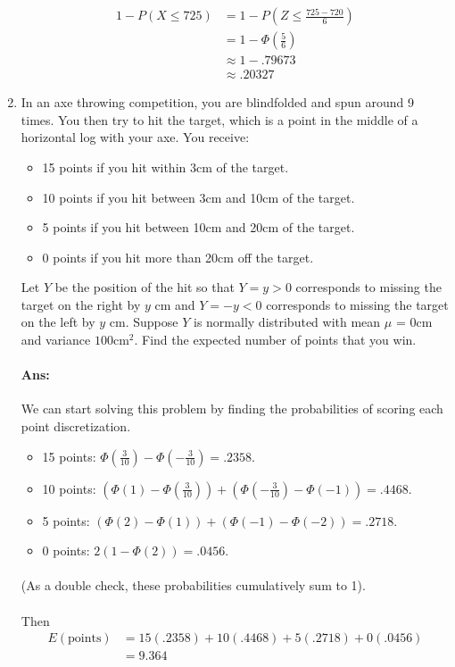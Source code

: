 \documentclass[letterpaper,12pt]{article}
\begin{document}
\begin{enumerate}
\begin{align*}
    1 - P(X \le 725) &= 1 - P(Z \le \frac{725-720}{6})\\
                     &= 1 - \Phi(\frac{5}{6})\\
                     &\approx 1 - .79673\\
                     &\approx .20327
\end{align*}
\item In an axe throwing competition, you are blindfolded and spun around 9 times. You then
try to hit the target, which is a point in the middle of a horizontal log with your axe.
You receive:

\begin{itemize}
    \item 15 points if you hit within 3cm of the target.
    \item 10 points if you hit between 3cm and 10cm of the target.
    \item 5 points if you hit between 10cm and 20cm of the target.
    \item 0 points if you hit more than 20cm off the target.
\end{itemize}
Let $Y$ be the position of the hit so that $Y = y > 0$ corresponds to missing the target
on the right by $y$ cm and $Y = -y < 0$ corresponds to missing the target on the left by
$y$ cm. Suppose $Y$ is normally distributed with mean $\mu$ = $0$cm and variance $100 \mathrm{cm}^2$.
Find the expected number of points that you win.
\paragraph{Ans:} We can start solving this problem by finding the probabilities of scoring each point 
discretization.
\begin{itemize}
    \item 15 points: $\Phi(\frac{3}{10}) - \Phi(-\frac{3}{10}) = .2358$.
    \item 10 points: $(\Phi(1) - \Phi(\frac{3}{10})) + (\Phi(-\frac{3}{10})-\Phi(-1)) = .4468$.
    \item 5 points: $(\Phi(2) - \Phi(1)) + (\Phi(-1)-\Phi(-2)) = .2718$.
    \item 0 points: $2(1- \Phi(2)) = .0456$.
\end{itemize}
\paragraph{}(As a double check, these probabilities cumulatively sum to 1).
\paragraph{}Then
\begin{align*}
    E(\mathrm{points}) &= 15(.2358) + 10(.4468) + 5(.2718) + 0(.0456)\\
                       &= 9.364
\end{align*}
\end{enumerate}
\end{document}
